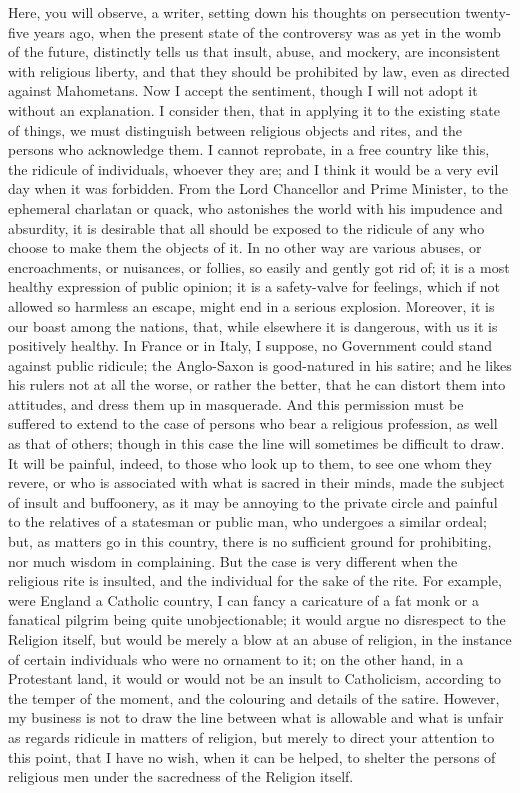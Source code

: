 Here, you will observe, a writer, setting down his
thoughts on persecution twenty-five years ago, when the
present state of the controversy was as yet in the womb
of the future, distinctly tells us that insult, abuse,
and mockery, are inconsistent with religious liberty, and
that they should be prohibited by law, even as directed
against Mahometans. Now I accept the sentiment, though I
will not adopt it without an explanation. I consider
then, that in applying it to the existing state of
things, we must distinguish between religious objects and
rites, and the persons who acknowledge them. I cannot
reprobate, in a free country like this, the ridicule of
individuals, whoever they are; and I think it would be a
very evil day when it was forbidden. From the Lord
Chancellor and Prime Minister, to the ephemeral charlatan
or quack, who astonishes the world with his impudence and
absurdity, it is desirable that all should be exposed to
the ridicule of any who choose to make them the objects
of it. In no other way are various abuses, or
encroachments, or nuisances, or follies, so easily and
gently got rid of; it is a most healthy expression of
public opinion; it is a safety-valve for feelings, which
if not allowed so harmless an escape, might end in a
serious explosion. Moreover, it is our boast among the
nations, that, while elsewhere it is dangerous, with us
it is positively healthy. In France or in Italy, I
suppose, no Government could stand against public
ridicule; the Anglo-Saxon is good-natured in his satire;
and he likes his rulers not at all the worse, or rather
the better, that he can distort them into attitudes, and
dress them up in masquerade. And this permission must be
suffered to extend to the case of persons who bear a
religious profession, as well as that of others; though
in this case the line will sometimes be difficult to
draw. It will be painful, indeed, to those who look up to
them, to see one whom they revere, or who is associated
with what is sacred in their minds, made the subject of
insult and buffoonery, as it may be annoying to the
private circle and painful to the relatives of a
statesman or public man, who undergoes a similar ordeal;
but, as matters go in this country, there is no
sufficient ground for prohibiting, nor much wisdom in
complaining. But the case is very different when the
religious rite is insulted, and the individual for the
sake of the rite. For example, were England a Catholic
country, I can fancy a caricature of a fat monk or a
fanatical pilgrim being quite unobjectionable; it would
argue no disrespect to the Religion itself, but would be
merely a blow at an abuse of religion, in the instance of
certain individuals who were no ornament to it; on the
other hand, in a Protestant land, it would or would not
be an insult to Catholicism, according to the temper of
the moment, and the colouring and details of the satire.
However, my business is not to draw the line between what
is allowable and what is unfair as regards ridicule in
matters of religion, but merely to direct your attention
to this point, that I have no wish, when it can be
helped, to shelter the persons of religious men under the
sacredness of the Religion itself.

